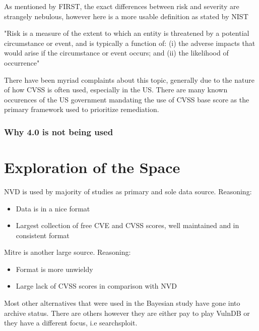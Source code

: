 \documentclass[11pt]{article}
\begin{document}
As mentioned by FIRST, the exact differences between risk and severity are strangely nebulous,
however here is a more usable definition as stated by NIST

"Risk is a measure of the extent to which an entity is threatened by a potential circumstance or event, and is
typically a function of: (i) the adverse impacts that would arise if the circumstance or event occurs; and (ii) the
likelihood of occurrence"

There have been myriad complaints about this topic, generally due to the nature of how CVSS is often
used, especially in the US. There are many known occurences of the US government mandating the use
of CVSS base score as the primary framework used to prioritize remediation.





\subsubsection{Why 4.0 is not being used}
\section{Exploration of the Space}

NVD is used by majority of studies as primary and sole data source.
Reasoning:
\begin{itemize}
	\item Data is in a nice format
	\item Largest collection of free CVE and CVSS scores, well maintained and in consistent format
\end{itemize}

Mitre is another large source.
Reasoning:
\begin{itemize}
	\item Format is more unwieldy
	\item Large lack of CVSS scores in comparison with NVD
\end{itemize}

Most other alternatives that were used in the Bayesian study have gone into archive status. There
are others however they are either pay to play VulnDB or they have a different focus, i.e
searchsploit.
\end{document}
